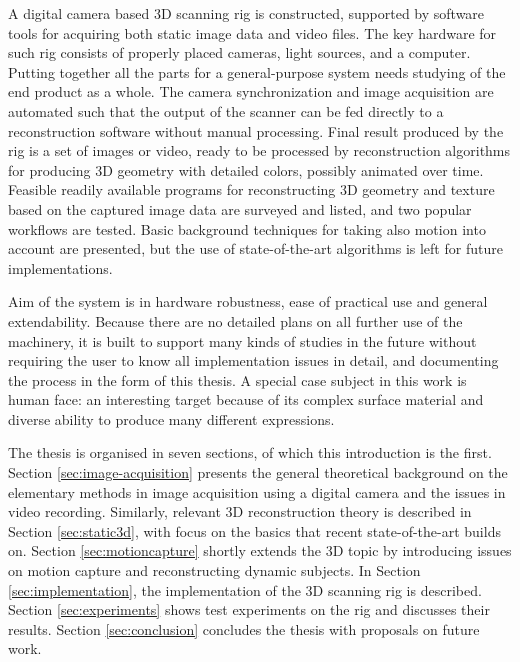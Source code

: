 A digital camera based 3D scanning rig is constructed, supported by software tools for acquiring both static image data and video files.
The key hardware for such rig consists of properly placed cameras, light sources, and a computer.
Putting together all the parts for a general-purpose system needs studying of the end product as a whole.
The camera synchronization and image acquisition are automated such that the output of the scanner can be fed directly to a reconstruction software without manual processing.
Final result produced by the rig is a set of images or video, ready to be processed by reconstruction algorithms for producing 3D geometry with detailed colors, possibly animated over time.
Feasible readily available programs for reconstructing 3D geometry and texture based on the captured image data are surveyed and listed, and two popular workflows are tested.
Basic background techniques for taking also motion into account are presented, but the use of state-of-the-art algorithms is left for future implementations.

Aim of the system is in hardware robustness, ease of practical use and general extendability.
Because there are no detailed plans on all further use of the machinery, it is built to support many kinds of studies in the future without requiring the user to know all implementation issues in detail, and documenting the process in the form of this thesis.
A special case subject in this work is human face: an interesting target because of its complex surface material and diverse ability to produce many different expressions.

The thesis is organised in seven sections, of which this introduction is the first.
Section \ref{sec:image-acquisition} presents the general theoretical background on the elementary methods in image acquisition using a digital camera and the issues in video recording.
Similarly, relevant 3D reconstruction theory is described in Section \ref{sec:static3d}, with focus on the basics that recent state-of-the-art builds on.
Section \ref{sec:motioncapture} shortly extends the 3D topic by introducing issues on motion capture and reconstructing dynamic subjects.
In Section \ref{sec:implementation}, the implementation of the 3D scanning rig is described.
Section \ref{sec:experiments} shows test experiments on the rig and discusses their results.
Section \ref{sec:conclusion} concludes the thesis with proposals on future work.
